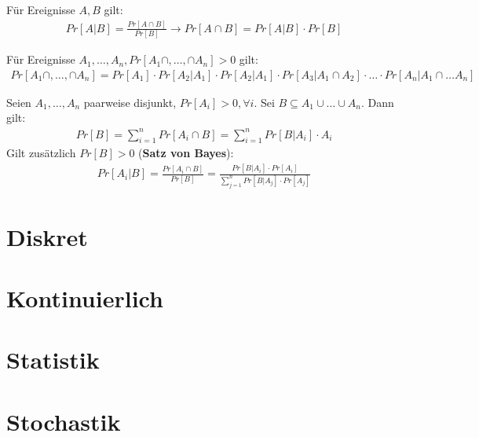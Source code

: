 \begin{satz}
	Für Ereignisse $A,B$ gilt:
	\begin{align*}
		Pr[A | B] = \frac{Pr[A \cap B]}{Pr[B]} \rightarrow Pr[A \cap B] = Pr [A | B] \cdot Pr[B]
	\end{align*}
\end{satz}

\begin{satz}[Multiplikationssatz]
	Für Ereignisse $A_1, \dots, A_n, Pr[A_1 \cap, \dots ,\cap A_n] > 0$ gilt:
	\begin{align*}
		Pr[A_1 \cap, \dots ,\cap A_n] = Pr[A_1]  \cdot Pr[A_2 | A_1] \cdot Pr[A_2|A_1] \cdot Pr[A_3 | A_1 \cap A_2] \cdot  \dots \cdot Pr[A_n | A_1 \cap \dots A_n] 
	\end{align*}
\end{satz}

\begin{satz}
	Seien $A_1,\dots,A_n$ paarweise disjunkt, $Pr[A_i] > 0, \forall i$. Sei $B \subseteq A_1 \cup \dots \cup A_n$. Dann gilt:
	\begin{align*}
	Pr[B] = \sum_{i=1}^{n} Pr[A_i \cap B] = \sum_{i=1}^n Pr[B | A_i] \cdot A_i
	\end{align*}
	Gilt zusätzlich $Pr[B] > 0$ (\textbf{Satz von Bayes}):
	\begin{align*}
		Pr[A_i | B] = \frac{Pr[A_i \cap B]}{Pr[B]} = \frac{Pr[B | A_i] \cdot Pr[A_i]}{\sum_{j=1}^n Pr[B | A_j] \cdot Pr[A_j]}
	\end{align*}
	
\end{satz}

\pagebreak
	
\section{Diskret}

\pagebreak

\section{Kontinuierlich}

\pagebreak

\section{Statistik}

\pagebreak

\section{Stochastik}

\pagebreak